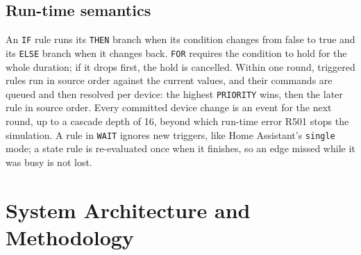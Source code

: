 \documentclass[conference]{IEEEtran}
\newcommand{\code}[1]{\texttt{#1}}
\begin{document}
\subsection{Run-time semantics}
An \code{IF} rule runs its \code{THEN} branch when its condition changes from false to true and its \code{ELSE} branch when it changes back. \code{FOR} requires the condition to hold for the whole duration; if it drops first, the hold is cancelled. Within one round, triggered rules run in source order against the current values, and their commands are queued and then resolved per device: the highest \code{PRIORITY} wins, then the later rule in source order. Every committed device change is an event for the next round, up to a cascade depth of 16, beyond which run-time error R501 stops the simulation. A rule in \code{WAIT} ignores new triggers, like Home Assistant's \code{single} mode; a state rule is re-evaluated once when it finishes, so an edge missed while it was busy is not lost.

\section{System Architecture and Methodology}\label{sec:arch}
\end{document}
